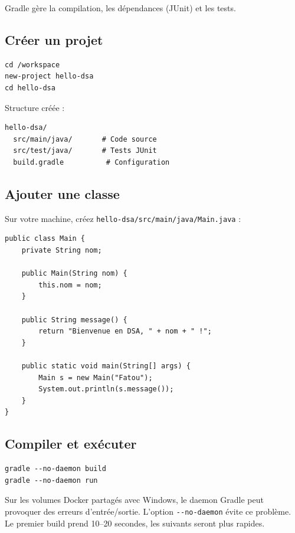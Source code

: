 \documentclass[11pt,a4paper]{article}
\begin{document}
Gradle gère la compilation, les dépendances (JUnit) et les tests.

\subsection{Créer un projet}

\begin{lstlisting}[style=bash]
cd /workspace
new-project hello-dsa
cd hello-dsa
\end{lstlisting}

Structure créée :

\begin{lstlisting}[style=bash]
hello-dsa/
  src/main/java/       # Code source
  src/test/java/       # Tests JUnit
  build.gradle          # Configuration
\end{lstlisting}

\subsection{Ajouter une classe}

Sur votre machine, créez \texttt{hello-dsa/src/main/java/Main.java} :

\begin{lstlisting}[style=java]
public class Main {
    private String nom;

    public Main(String nom) {
        this.nom = nom;
    }

    public String message() {
        return "Bienvenue en DSA, " + nom + " !";
    }

    public static void main(String[] args) {
        Main s = new Main("Fatou");
        System.out.println(s.message());
    }
}
\end{lstlisting}

\subsection{Compiler et exécuter}

\begin{lstlisting}[style=bash]
gradle --no-daemon build
gradle --no-daemon run
\end{lstlisting}

\begin{infobox}
Sur les volumes Docker partagés avec Windows, le daemon Gradle peut provoquer des erreurs d'entrée/sortie. L'option \texttt{-{}-no-daemon} évite ce problème. Le premier build prend 10--20 secondes, les suivants seront plus rapides.
\end{infobox}
\end{document}
